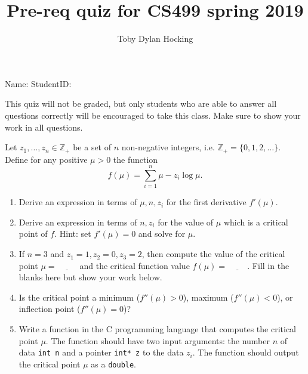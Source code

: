 \documentclass{article}
\begin{document}
\title{Pre-req quiz for CS499 spring 2019}
\author{Toby Dylan Hocking}
\thispagestyle{empty}

Name: \underline{\hspace{3in}} StudentID: \underline{\hspace{2in}}

This quiz will not be graded, but only students who are able to answer
all questions correctly will be encouraged to take this class. Make
sure to show your work in all questions.

Let $z_1, \dots, z_n\in\mathbb Z_+$ be a set of $n$ non-negative integers,
i.e. $\mathbb Z_+=\{0, 1, 2, \dots\}$. Define for any positive $\mu>0$ the function
$$ f(\mu) = \sum_{i=1}^n \mu - z_i\log \mu. $$

\begin{enumerate}
\item Derive an expression in terms of $\mu,n,z_i$ for the first derivative
  $f'(\mu)$. 

\vskip 1in
\item Derive an expression in terms of $n,z_i$ for the value of $\mu$
  which is a critical point of $f$. Hint: set $f'(\mu)=0$ and solve
  for $\mu$.

\vskip 1in
\item If $n=3$ and $z_1=1, z_2=0, z_3=2$, then compute the value of
  the critical point $\mu=\underline{\hspace{1cm}}$ and the critical
  function value $f(\mu)=\underline{\hspace{1cm}}$. Fill in the blanks
  here but show your work below.

\vskip 1in
\item Is the critical point a minimum ($f''(\mu)>0$), maximum
  ($f''(\mu)<0$), or inflection point ($f''(\mu)=0$)?

\vskip 1in
\item Write a function in the C programming language that computes the
  critical point $\mu$. The function should have two input arguments:
  the number $n$ of data \texttt{int n} and a pointer \texttt{int* z}
  to the data $z_i$. The function should output the critical point
  $\mu$ as a \texttt{double}.
\end{enumerate}
\end{document}
